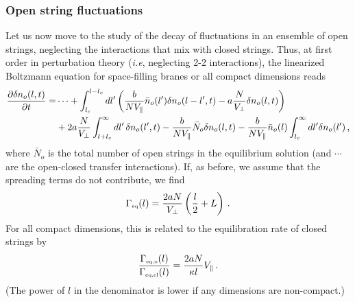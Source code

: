 \documentclass[a4paper,11pt]{article}
\newcommand{\lr}[1]{\left(#1\right)}
\begin{document}
\subsubsection*{Open string fluctuations}
Let us now move to the study of the decay of fluctuations in an ensemble of open strings, neglecting the interactions that mix with closed strings.
Thus, at first order in perturbation theory (\textit{i.e}, neglecting 2-2 interactions), the linearized Boltzmann equation for space-filling branes or all
compact dimensions reads
\begin{equation}\label{eq:openopen}
\begin{split}
\frac{\partial \delta n_o(l,t)}{\partial t}= &\cdots +
\int_{l_c}^{l-l_c}{dl'\lr{\frac{b}{NV_\parallel } \Bar{n}_o(l')\delta n_o(l-l',t)-a\frac{N}{V_\perp}\delta n_o(l,t)}} \\
   & +2a\frac{N}{V_\perp}\int_{l+l_c}^\infty {dl'\, \delta n_o(l',t)}-\frac{b}{NV_\parallel}\bar{N}_o\delta n_o(l,t) -\frac{b}{N V_\parallel}\Bar{n}_o(l)
\int_{l_c}^\infty dl' \delta n_o(l')\, ,
\end{split}
\end{equation}
where $\bar{N}_o$ is the total number of open strings in the 
equilibrium solution (and $\cdots$ are the open-closed transfer interactions).
If, as before, we assume that the spreading terms do not contribute, we find 
\begin{equation}
    \Gamma_{\text{\tiny{eq}}}(l)=\frac{2aN}{V_\perp}\lr{\frac{l}{2}+L}\, .
\end{equation}
For all compact dimensions, this is related to the equilibration rate of 
closed strings by
\begin{equation}\label{compacteqratio}
    \frac{\Gamma_{\text{\tiny{eq,o}}}(l)}{\Gamma_{\text{\tiny{eq,cl}}}(l)}= \frac{2aN}{\kappa l}V_\parallel \, .
\end{equation}
(The power of $l$ in the denominator is lower if any dimensions are 
non-compact.)
\end{document}
